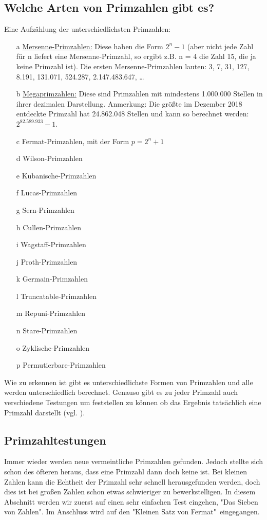 \documentclass[12pt,a4paper]{article}
\theoremstyle{definition}
\begin{document}
\subsection{Welche Arten von Primzahlen gibt es?}\label{Welche Arten von Primzahlen gibt es?}
Eine Aufzählung der unterschiedlichsten Primzahlen:
\begin{itemize}
\item [a]\underline{Mersenne-Primzahlen:} Diese haben die Form $2^{n}-1$ (aber nicht jede Zahl für n liefert  eine Mersenne-Primzahl, so ergibt z.B. n = 4 die Zahl 15, die ja keine Primzahl ist).
Die ersten Mersenne-Primzahlen lauten: 3, 7, 31, 127, 8.191, 131.071, 524.287, 2.147.483.647, …
\item [b]\underline{Megaprimzahlen:} Diese sind Primzahlen mit mindestens 1.000.000 Stellen in ihrer dezimalen Darstellung.
Anmerkung: Die größte im Dezember 2018 entdeckte Primzahl hat 24.862.048 Stellen und kann so berechnet werden: $2^{82.589.933}-1$.
\item [c]Fermat-Primzahlen, mit der Form $p = 2^n + 1$
\item [d]Wilson-Primzahlen
\item [e]Kubanische-Primzahlen
\item [f]Lucas-Primzahlen
\item [g]Sern-Primzahlen
\item [h]Cullen-Primzahlen
\item [i]Wagstaff-Primzahlen
\item [j]Proth-Primzahlen
\item [k]Germain-Primzahlen
\item [l]Truncatable-Primzahlen
\item [m]Repuni-Primzahlen
\item [n]Stare-Primzahlen
\item [o]Zyklische-Primzahlen
\item [p]Permutierbare-Primzahlen
\end{itemize}
Wie zu erkennen ist gibt es unterschiedlichste Formen von Primzahlen und alle werden unterschiedlich berechnet.
Genauso gibt es zu jeder Primzahl auch verschiedene Testungen um feststellen zu können ob das Ergebnis tatsächlich eine Primzahl darstellt (vgl. \cite[86--90]{Engel2017}).

\subsection{Primzahltestungen}
Immer wieder werden neue vermeintliche Primzahlen gefunden.
Jedoch stellte sich schon des öfteren heraus, dass eine Primzahl dann doch keine ist.
Bei kleinen Zahlen kann die Echtheit der Primzahl sehr schnell herausgefunden werden, doch dies ist bei großen Zahlen schon etwas schwieriger zu bewerkstelligen.
In diesem Abschnitt werden wir zuerst auf einen sehr einfachen Test eingehen, "Das Sieben von Zahlen".
Im Anschluss wird auf den "Kleinen Satz von Fermat"\ eingegangen.
\end{document}
